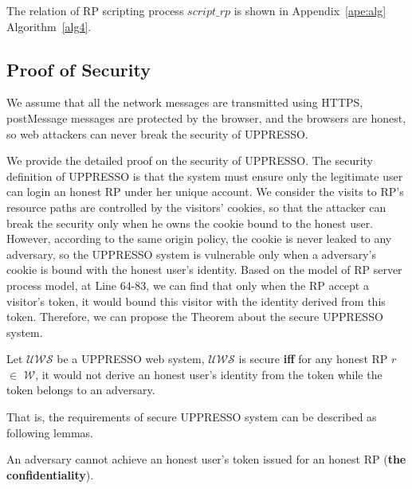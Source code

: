 The relation of RP scripting process $script\_rp$ is shown in Appendix~\ref{ape:alg} Algorithm~\ref{alg4}.

\subsection{Proof of Security}

We assume that all the network messages are transmitted using HTTPS, postMessage messages are protected by the browser, and the browsers are  honest, so web attackers can never break the security of UPPRESSO.

We provide the detailed proof on the security of UPPRESSO. The security definition of UPPRESSO is that the system must ensure only the legitimate user can login an honest RP under her unique account. We consider the visits to RP's resource paths are controlled by the visitors' cookies, so that the attacker can break the security only when he owns the cookie bound to the honest user.
However, according to the same origin policy, the cookie is never leaked to any adversary, so the UPPRESSO  system is vulnerable only when a adversary's cookie is bound with the honest user's identity.
Based on the model of RP server process model, at Line 64-83, we can find that only when the RP accept a visitor's token, it would bound this visitor with the identity derived from this token.
Therefore, we can propose the Theorem about the secure UPPRESSO system.
\begin{theorem}
Let $\mathcal{UWS}$ be a UPPRESSO web system, $\mathcal{UWS}$ is secure \textbf{iff} for any honest RP $r$ $\in $ $\mathcal{W}$, it would not derive an honest user's identity from the token while the token belongs to an adversary.
\end{theorem}
That is, the requirements of secure UPPRESSO system can be described as following lemmas.
\begin{lemma}
An adversary cannot achieve an honest user's token issued for an honest RP (\textbf{the confidentiality}).
\label{lemma:confidentiality}
\end{lemma}
